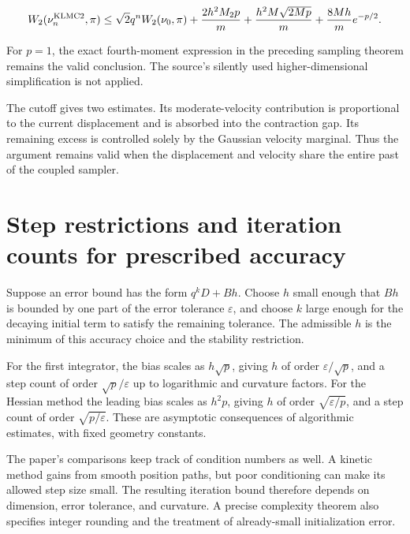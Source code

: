 \documentclass[11pt,a4paper]{report}
\begin{document}
\[W_2(\nu_n^{\rm KLMC2},\pi)\le
\sqrt2q^n W_2(\nu_0,\pi)
+\frac{2h^2M_2p}{m}+\frac{h^2M\sqrt{2Mp}}m
+\frac{8Mh}{m}e^{-p/2}.\]


For \(p=1\), the exact fourth-moment expression in the preceding
sampling theorem remains the valid conclusion. The source's silently used
higher-dimensional simplification is not applied.



The cutoff gives two estimates. Its moderate-velocity contribution is proportional to the current displacement and is absorbed into the contraction gap. Its remaining excess is controlled solely by the Gaussian velocity marginal. Thus the argument remains valid when the displacement and velocity share the entire past of the coupled sampler.

\section{\texorpdfstring{Step restrictions and iteration counts for prescribed accuracy}{Step restrictions and iteration counts for prescribed accuracy}}


Suppose an error bound has the form \(q^kD+Bh\). Choose
\(h\) small enough that \(Bh\) is bounded by one part of the error tolerance
\(\varepsilon\), and choose \(k\) large enough for the decaying initial
term to satisfy the remaining tolerance. The admissible \(h\) is the minimum of this accuracy
choice and the stability restriction.




For the first integrator, the bias scales as \(h\sqrt p\), giving
\(h\) of order \(\varepsilon/\sqrt p\), and a step count of order
\(\sqrt p/\varepsilon\) up to logarithmic and curvature factors.
For the Hessian method the leading bias scales as \(h^2p\), giving
\(h\) of order \(\sqrt{\varepsilon/p}\), and a step count of order
\(\sqrt{p/\varepsilon}\). These are asymptotic consequences of algorithmic estimates, with fixed geometry constants.




The paper's comparisons keep track of condition numbers as well. A kinetic
method gains from smooth position paths, but poor conditioning can make its
allowed step size small. The resulting iteration bound therefore depends on dimension, error tolerance, and curvature. A precise
complexity theorem also specifies integer rounding and the treatment of
already-small initialization error.
\end{document}
